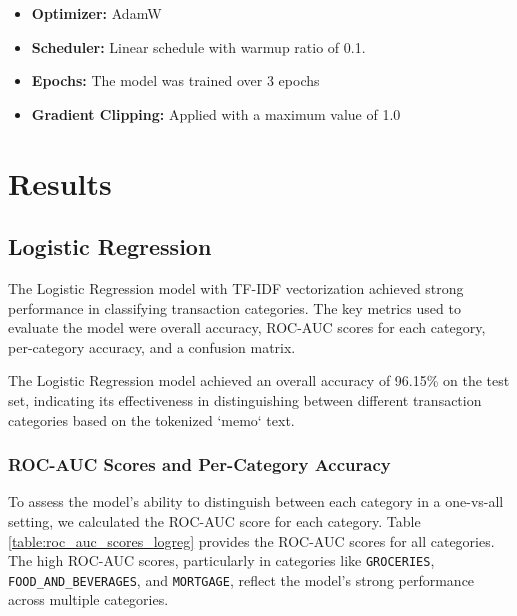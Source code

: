 \documentclass[12pt,letterpaper]{article}
\begin{document}
\begin{itemize}
    \item \textbf{Optimizer:} AdamW
    \item \textbf{Scheduler:} Linear schedule with warmup ratio of 0.1.
    \item \textbf{Epochs:} The model was trained over 3 epochs
    \item \textbf{Gradient Clipping:} Applied with a maximum value of 1.0
\end{itemize}



\section{Results}
\subsection{Logistic Regression}

The Logistic Regression model with TF-IDF vectorization achieved strong performance in classifying transaction categories. The key metrics used to evaluate the model were overall accuracy, ROC-AUC scores for each category, per-category accuracy, and a confusion matrix.

The Logistic Regression model achieved an overall accuracy of 96.15\% on the test set, indicating its effectiveness in distinguishing between different transaction categories based on the tokenized `memo` text.

\subsubsection{ROC-AUC Scores and Per-Category Accuracy}
To assess the model’s ability to distinguish between each category in a one-vs-all setting, we calculated the ROC-AUC score for each category. Table \ref{table:roc_auc_scores_logreg} provides the ROC-AUC scores for all categories. The high ROC-AUC scores, particularly in categories like \texttt{GROCERIES}, \texttt{FOOD\_AND\_BEVERAGES}, and \texttt{MORTGAGE}, reflect the model's strong performance across multiple categories.
\end{document}
